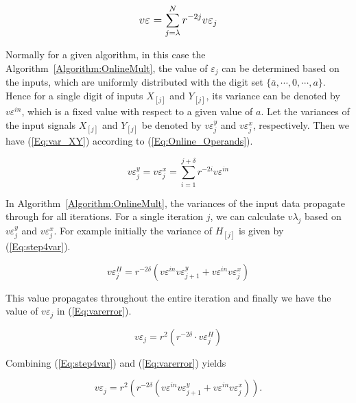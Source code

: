 \documentclass[journal]{IEEEtran}
\begin{document}
\begin{eqnarray}\label{Eq:VarianceErrorMagnitude}
\scriptsize
	v\varepsilon=\sum_{j=\lambda}^{N} r^{-2j}v\varepsilon_j
\normalsize
\end{eqnarray}

Normally for a given algorithm, in this case the Algorithm~\ref{Algorithm:OnlineMult}, the value of $\varepsilon_j$ can be determined based on the inputs, which are uniformly distributed with the digit set $\{\overline{a},\cdots,0,\cdots,a\}$. Hence for a single digit of inputs $X_{[j]}$ and $Y_{[j]}$, its variance can be denoted by $v\varepsilon^{in}$, which is a fixed value with respect to a given value of $a$. Let the variances of the input signals $X_{[j]}$ and $Y_{[j]}$ be denoted by $v\varepsilon^y_j $ and $ v\varepsilon^x_j$, respectively. Then we have (\ref{Eq:var_XY}) according to (\ref{Eq:Online_Operands}).

\begin{equation}\label{Eq:var_XY}
{v\varepsilon}^y_j = {v\varepsilon}^x_j =\sum_{i=1}^{j+\delta} r^{-2i} v\varepsilon^{in}
\end{equation}

In Algorithm~\ref{Algorithm:OnlineMult}, the variances of the input data propagate through for all iterations. For a single iteration $j$, we can calculate $v\lambda_j$ based on $v\varepsilon^y_j $ and $ v\varepsilon^x_j$. For example initially the variance of $H_{[j]}$ is given by (\ref{Eq:step4var}). 

\begin{equation}\label{Eq:step4var}
{v\varepsilon}^H_j =r^{-2\delta}(v\varepsilon^{in}  v\varepsilon^y_{j+1} +v\varepsilon^{in}  v\varepsilon^x_j) 
\end{equation}

This value propagates throughout the entire iteration and finally we have the value of $v\varepsilon_j$ in (\ref{Eq:varerror}).

\begin{equation}\label{Eq:varerror}
v\varepsilon_j=r^2 \left( r^{-2\delta}\cdot {v\varepsilon}^H_j \right)
\end{equation}

Combining (\ref{Eq:step4var}) and (\ref{Eq:varerror}) yields 

\begin{equation}\label{Eq:varerror_final}
v\varepsilon_j=r^2 \left( r^{-2\delta} \left( v\varepsilon^{in}  v\varepsilon^y_{j+1} +v\varepsilon^{in}  v\varepsilon^x_j \right) \right).
\end{equation}
\end{document}
